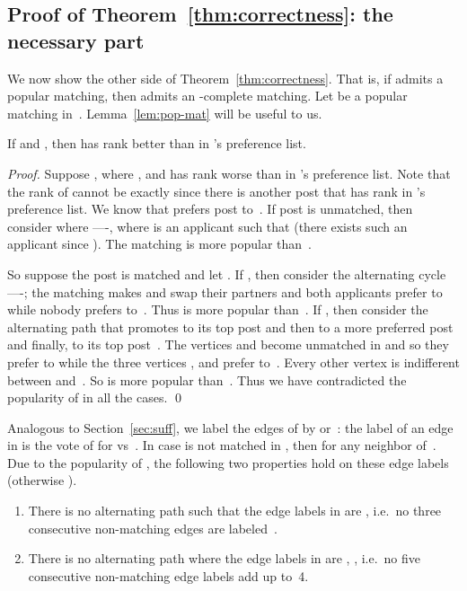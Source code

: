 \documentclass[11pt]{llncs}
\begin{document}
\subsection{Proof of Theorem~\ref{thm:correctness}: the necessary part}
We now show the other side of Theorem~\ref{thm:correctness}. That is, if  admits a popular 
matching, then  admits an -complete matching. Let  be a popular matching in~. 
Lemma~\ref{lem:pop-mat} will be useful to us.
\begin{lemma}
\label{lem:pop-mat}
If  and , then  has rank better than  in 's preference list.
\end{lemma}
\begin{proof}
Suppose , where , and  has rank worse than  in 's preference list. Note that the rank of  cannot be exactly  since there is another 
post  that has rank  in 's preference list. We know that  prefers post 
 to~. If post  is unmatched, then consider  where ----, where  is an applicant such that  (there exists such an applicant since ). The matching  is more popular than~. 

So suppose the post  is matched and let . If , then consider the alternating cycle 
----; the matching  makes  and  swap their partners and both applicants prefer
 to  while nobody prefers  to~. Thus  is more popular than~.
If , then consider the alternating path  that promotes  to its top post  and then  to a more 
preferred post  and finally,  to its top post~.
The vertices  and  become unmatched in  and so they prefer  
to   while the three vertices , and   prefer  to~. 
Every other vertex is indifferent between  and~.
So  is more popular than~. Thus we have contradicted the popularity of  in all the cases. \qed
\end{proof}


Analogous to Section~\ref{sec:suff}, we label the edges of  by  or~: the label of an edge  in 
 is the vote of  for  vs~. In case  is not matched in , 
then  for any neighbor  of~. Due to the popularity of , 
the following two properties hold on these edge labels (otherwise ).

\begin{enumerate} 
\item[] There is no alternating path  such that the edge labels in 
 are , i.e.\
no three consecutive non-matching edges are labeled~. 
\item[]  There is no alternating path  where the edge labels in 
 are , , i.e.\
no five consecutive non-matching edge labels add up to~4.
\end{enumerate}
\end{document}
